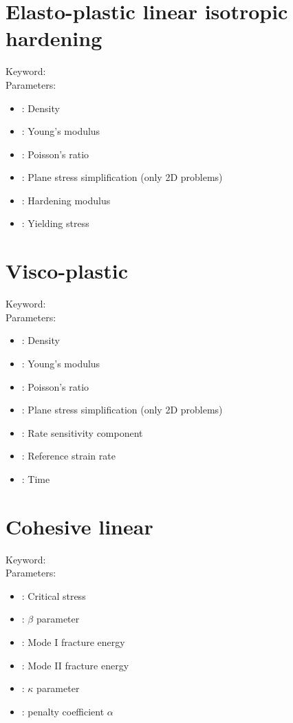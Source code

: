 \section{Elasto-plastic linear isotropic hardening}

Keyword: \\

\noindent Parameters:
\begin{itemize}
\item {}: Density
\item {}: Young's modulus
\item {}: Poisson's ratio
\item {}: Plane stress simplification (only 2D problems)
\item {}: Hardening modulus
\item {}: Yielding stress
\end{itemize}

\section{Visco-plastic}

Keyword: \\

\noindent Parameters:
\begin{itemize}
\item {}: Density
\item {}: Young's modulus
\item {}: Poisson's ratio
\item {}: Plane stress simplification (only 2D problems)
\item {}: Rate sensitivity component
\item {}: Reference strain rate
\item {}: Time
\end{itemize}

\section{Cohesive linear}

Keyword: \\

\noindent Parameters:
\begin{itemize}
\item {}: Critical stress
\item {}: $\beta$ parameter
\item {}: Mode I fracture energy
\item {}: Mode II fracture energy
\item {}: $\kappa$ parameter
\item {}: penalty coefficient $\alpha$
\end{itemize}

